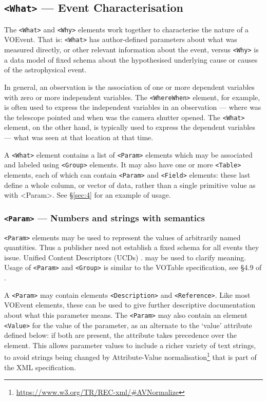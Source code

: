 \documentclass[11pt,a4paper]{ivoa}
\begin{document}
\subsection{\texttt{<What>} --- Event Characterisation}
\label{sec:3.3}
The \verb|<What>| and \verb|<Why>| elements work together to characterise the
nature of a VOEvent. That is: \verb|<What>| has author-defined parameters about
what was measured directly, or other relevant information about the event,
versus \verb|<Why>| is a data model of fixed schema about the hypothesised
underlying cause or causes of the astrophysical event.

In general, an observation is the association of one or more dependent variables
with zero or more independent variables. The \verb|<WhereWhen>| element, for
example, is often used to express the independent variables in an observation
--- where was the telescope pointed and when was the camera shutter opened. The
\verb|<What>| element, on the other hand, is typically used to express the
dependent variables --- what was seen at that location at that time.

A \verb|<What>| element contains a list of \verb|<Param>| elements which may be
associated and labeled using \verb|<Group>| elements. It may also have one or
more \verb|<Table>| elements, each of which can contain \verb|<Param>| and \verb|<Field>|
elements: these last define a whole column, or vector of data, rather than a
single primitive value as with <Param>. See \S\ref{sec:4} for an example of
usage.

\subsubsection{\texttt{<Param>} --- Numbers and strings with semantics}
\label{sec:3.3.1}
\verb|<Param>| elements may be used to represent the values of arbitrarily named
quantities. Thus a publisher need not establish a fixed schema for all events
they issue. Unified Content Descriptors (UCDs) \citep{2018ivoa.spec.0527P}.
may be used to clarify meaning. Usage of \verb|<Param>| and \verb|<Group>| is
similar to the VOTable specification, see \S4.9 of \citep{2019ivoa.spec.1021O}.

A \verb|<Param>| may contain elements \verb|<Description>| and \verb|<Reference>|.
Like most VOEvent elements, these can be used to give further descriptive
documentation about what this parameter means. The \verb|<Param>| may also
contain an element \verb|<Value>| for the value of the parameter, as an alternate
to the `value' attribute defined below: if both are present, the attribute takes
precedence over the element. This allows parameter values to include a richer
variety of text strings, to avoid strings being changed by Attribute-Value
normalisation\footnote{\url{https://www.w3.org/TR/REC-xml/\#AVNormalize}} that
is part of the XML specification.
\end{document}

